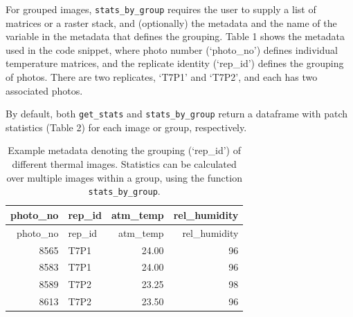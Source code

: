 \documentclass[12pt,british,a4paper,]{article}
\newenvironment{Shaded}{\begin{snugshade}}{\end{snugshade}}
\newcommand{\KeywordTok}[1]{\textcolor[rgb]{0.13,0.29,0.53}{\textbf{#1}}}
\newcommand{\DataTypeTok}[1]{\textcolor[rgb]{0.13,0.29,0.53}{#1}}
\newcommand{\StringTok}[1]{\textcolor[rgb]{0.31,0.60,0.02}{#1}}
\newcommand{\CommentTok}[1]{\textcolor[rgb]{0.56,0.35,0.01}{\textit{#1}}}
\newcommand{\OtherTok}[1]{\textcolor[rgb]{0.56,0.35,0.01}{#1}}
\newcommand{\OperatorTok}[1]{\textcolor[rgb]{0.81,0.36,0.00}{\textbf{#1}}}
\newcommand{\NormalTok}[1]{#1}
\theoremstyle{definition}
\theoremstyle{definition}
\theoremstyle{definition}
\theoremstyle{remark}
\begin{document}
\begin{Shaded}
\end{Shaded}

For grouped images, \texttt{stats\_by\_group} requires the user to
supply a list of matrices or a raster stack, and (optionally) the
metadata and the name of the variable in the metadata that defines the
grouping. Table 1 shows the metadata used in the code snippet, where
photo number (`photo\_no') defines individual temperature matrices, and
the replicate identity (`rep\_id') defines the grouping of photos. There
are two replicates, `T7P1' and `T7P2', and each has two associated
photos.

By default, both \texttt{get\_stats} and \texttt{stats\_by\_group}
return a dataframe with patch statistics (Table 2) for each image or
group, respectively.

\begin{longtable}[]{@{}rlrr@{}}
\caption{Example metadata denoting the grouping (`rep\_id') of different
thermal images. Statistics can be calculated over multiple images within
a group, using the function \texttt{stats\_by\_group}.}\tabularnewline
\toprule
photo\_no & rep\_id & atm\_temp & rel\_humidity\tabularnewline
\midrule
\endfirsthead
\toprule
photo\_no & rep\_id & atm\_temp & rel\_humidity\tabularnewline
\midrule
\endhead
8565 & T7P1 & 24.00 & 96\tabularnewline
8583 & T7P1 & 24.00 & 96\tabularnewline
8589 & T7P2 & 23.25 & 98\tabularnewline
8613 & T7P2 & 23.50 & 96\tabularnewline
\bottomrule
\end{longtable}
\end{document}
